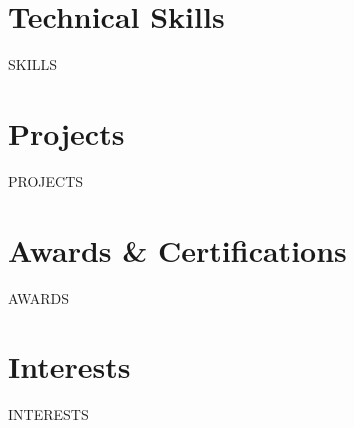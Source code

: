 \documentclass[10pt,letterpaper]{article}
\newcommand{\projentry}[3]{%
  \par\nobreak\vspace{4pt}%
  \textbf{#1}\enspace\textit{| #2}\hfill\textbf{#3}%
  \par\nopagebreak\vspace{1pt}%
}
\newcommand{\awardentry}[3]{%
  \par\nobreak\vspace{3pt}%
  \textbf{#1}\enspace|\enspace#2\hfill\textit{#3}%
  \vspace{2pt}%
}
\begin{document}
\section{Technical Skills}
\RaggedRight
{{SKILLS}}

\section{Projects}
{{PROJECTS}}

\section{Awards \& Certifications}
{{AWARDS}}

\section{Interests}
\RaggedRight
{{INTERESTS}}
\end{document}
